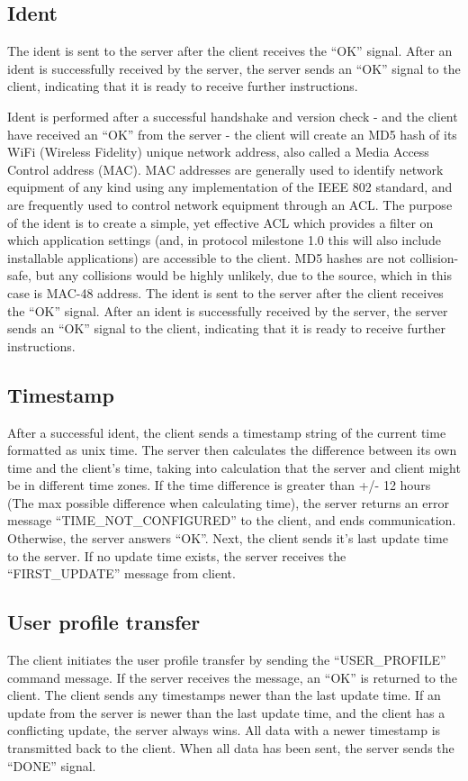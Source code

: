 \subsection{Ident}

The ident is sent to the server after the client receives the ``OK'' signal. After an ident is successfully received by the server, the server sends an ``OK'' signal to the client, indicating that it is ready to receive further instructions. 

Ident is performed after a successful handshake and version check - and the client have received an ``OK'' from the server - the client will create an MD5 hash of its WiFi (Wireless Fidelity) unique network address, also called a Media Access Control address (MAC). MAC addresses are generally used to identify network equipment of any kind using any implementation of the IEEE 802 standard\cite{IEEE}, and are frequently used to control network equipment through an ACL\cite{cisco}. The purpose of the ident is to create a simple, yet effective ACL which provides a filter on which application settings (and, in protocol milestone 1.0 this will also include installable applications) are accessible to the client. MD5 hashes are not collision-safe\cite{ACCESSDATA}, but any collisions would be highly unlikely, due to the source, which in this case is MAC-48 address. 
The ident is sent to the server after the client receives the ``OK'' signal. After an ident is successfully received by the server, the server sends an ``OK'' signal to the client, indicating that it is ready to receive further instructions. 
 

\subsection{Timestamp}
After a successful ident, the client sends a timestamp string of the current time formatted as unix time. The server then calculates the difference between its own time and the client's time, taking into calculation that the server and client might be in different time zones. If the time difference is greater than +/- 12 hours (The max possible difference when calculating time), the server returns an error message ``TIME\_NOT\_CONFIGURED'' to the client, and ends communication. Otherwise, the server answers ``OK''. 
Next, the client sends it's last update time to the server. If no update time exists, the server receives the ``FIRST\_UPDATE'' message from client.

\subsection{User profile transfer}
The client initiates the user profile transfer  by sending the ``USER\_PROFILE'' command message. If the server receives the message, an ``OK'' is returned to the client. The client sends any timestamps newer than the last update time. If an update from the server is newer than the last update time, and the client has a conflicting update, the server always wins. All data with a newer timestamp is transmitted back to the client. When all data has been sent, the server sends the ``DONE'' signal. 

